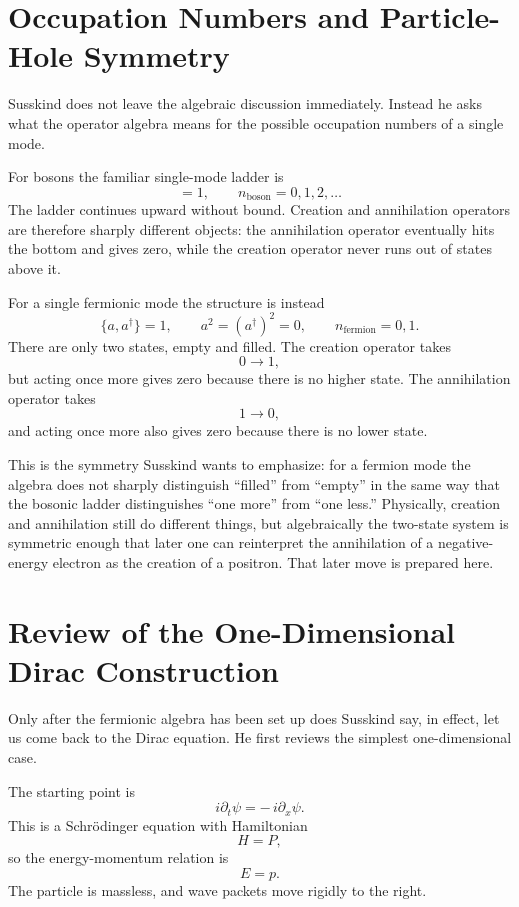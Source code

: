 \section{Occupation Numbers and Particle-Hole Symmetry}

Susskind does not leave the algebraic discussion immediately. Instead he asks what the operator algebra means for the possible occupation numbers of a single mode.

For bosons the familiar single-mode ladder is
\begin{equation}
[a,a^\dagger]=1,
\qquad
n_{\text{boson}}=0,1,2,\dots
\end{equation}
The ladder continues upward without bound. Creation and annihilation operators are therefore sharply different objects: the annihilation operator eventually hits the bottom and gives zero, while the creation operator never runs out of states above it.

For a single fermionic mode the structure is instead
\begin{equation}
\{a,a^\dagger\}=1,
\qquad
a^2=(a^\dagger)^2=0,
\qquad
n_{\text{fermion}}=0,1.
\end{equation}
There are only two states, empty and filled. The creation operator takes
\[
0 \longrightarrow 1,
\]
but acting once more gives zero because there is no higher state. The annihilation operator takes
\[
1 \longrightarrow 0,
\]
and acting once more also gives zero because there is no lower state.

This is the symmetry Susskind wants to emphasize: for a fermion mode the algebra does not sharply distinguish ``filled'' from ``empty'' in the same way that the bosonic ladder distinguishes ``one more'' from ``one less.'' Physically, creation and annihilation still do different things, but algebraically the two-state system is symmetric enough that later one can reinterpret the annihilation of a negative-energy electron as the creation of a positron. That later move is prepared here.

\section{Review of the One-Dimensional Dirac Construction}

Only after the fermionic algebra has been set up does Susskind say, in effect, let us come back to the Dirac equation. He first reviews the simplest one-dimensional case.

The starting point is
\begin{equation}
i\partial_t\psi=-\,i\partial_x\psi.
\end{equation}
This is a Schr\"odinger equation with Hamiltonian
\begin{equation}
H=P,
\end{equation}
so the energy-momentum relation is
\begin{equation}
E=p.
\end{equation}
The particle is massless, and wave packets move rigidly to the right.

